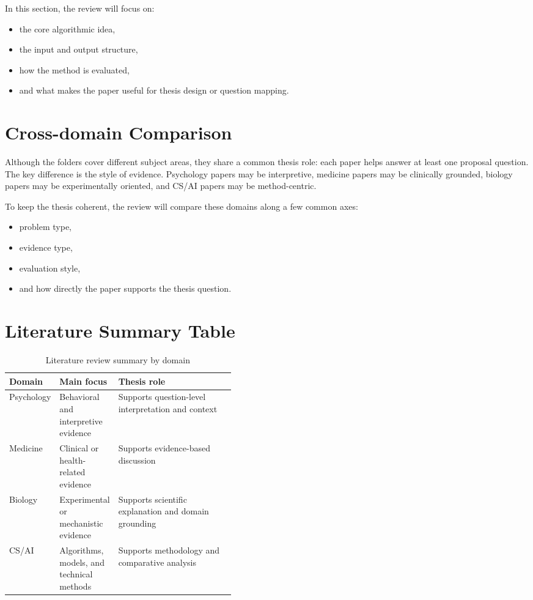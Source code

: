 \documentclass[12pt,a4paper,oneside]{book}
\begin{document}
In this section, the review will focus on:
\begin{itemize}[leftmargin=*]
  \item the core algorithmic idea,
  \item the input and output structure,
  \item how the method is evaluated,
  \item and what makes the paper useful for thesis design or question mapping.
\end{itemize}

\section{Cross-domain Comparison}
Although the folders cover different subject areas, they share a common thesis role: each paper helps answer at least one proposal question. The key difference is the style of evidence. Psychology papers may be interpretive, medicine papers may be clinically grounded, biology papers may be experimentally oriented, and CS/AI papers may be method-centric.

To keep the thesis coherent, the review will compare these domains along a few common axes:
\begin{itemize}[leftmargin=*]
  \item problem type,
  \item evidence type,
  \item evaluation style,
  \item and how directly the paper supports the thesis question.
\end{itemize}

\section{Literature Summary Table}
\begin{table}[H]
\centering
\caption{Literature review summary by domain}
\begin{tabularx}{\linewidth}{>{\raggedright\arraybackslash}p{0.17\linewidth} >{\raggedright\arraybackslash}p{0.26\linewidth} >{\raggedright\arraybackslash}X}
\toprule
Domain & Main focus & Thesis role \\
\midrule
Psychology & Behavioral and interpretive evidence & Supports question-level interpretation and context \\
Medicine & Clinical or health-related evidence & Supports evidence-based discussion \\
Biology & Experimental or mechanistic evidence & Supports scientific explanation and domain grounding \\
CS/AI & Algorithms, models, and technical methods & Supports methodology and comparative analysis \\
\bottomrule
\end{tabularx}
\end{table}
\end{document}
